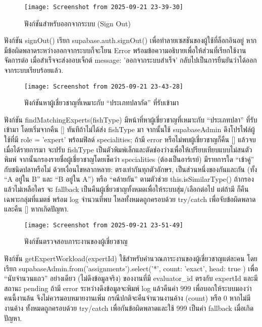 \newpage

\begin{figure}[h]
	\centering
	\texttt{[image: Screenshot from 2025-09-21 23-39-30]}
	\caption{ฟังก์ชันสำหรับออกจากระบบ (Sign Out)}
\end{figure}

\indent ฟังก์ชัน signOut() เรียก supabase.auth.signOut() เพื่อทำลายเซสชันของผู้ใช้ที่ล็อกอินอยู่ หากมีข้อผิดพลาดระหว่างออกจากระบบก็จะโยน Error พร้อมข้อความอธิบายเพื่อให้ส่วนที่เรียกใช้งานจัดการต่อ เมื่อสำเร็จจะส่งออบเจ็กต์ { message: 'ออกจากระบบสำเร็จ' } กลับไปเป็นการยืนยันว่าได้ออกจากระบบเรียบร้อยแล้ว.

\vspace{\baselineskip}

\begin{figure}[h]
	\centering
	\texttt{[image: Screenshot from 2025-09-21 23-43-28]}
	\caption{ฟังก์ชันหาผู้เชี่ยวชาญที่เหมาะกับ “ประเภทปลากัด” ที่รับเข้ามา}
\end{figure}

\indent ฟังก์ชัน findMatchingExperts(fishType) มีหน้าที่หาผู้เชี่ยวชาญที่เหมาะกับ “ประเภทปลา” ที่รับเข้ามา โดยเริ่มจากคืน [] ทันทีถ้าไม่ได้ส่ง fishType มา จากนั้นใช้ supabaseAdmin ดึงโปรไฟล์ผู้ใช้ที่มี role = 'expert' พร้อมฟิลด์ specialities; ถ้ามี error หรือไม่พบผู้เชี่ยวชาญก็คืน [] แล้วจบ เมื่อได้รายการมา จะปรับ fishType เป็นตัวพิมพ์เล็กและตัดช่องว่างเพื่อให้เปรียบเทียบแบบไม่สนตัวพิมพ์ จากนั้นกรองรายชื่อผู้เชี่ยวชาญโดยเช็คว่า specialities (ต้องเป็นอาร์เรย์) มีรายการใด “เข้าคู่” กับชนิดปลาหรือไม่ ด้วยเงื่อนไขหลากหลาย: ตรงเท่ากันทุกตัวอักษร, เป็นส่วนหนึ่งของกันและกัน (ทั้ง “A อยู่ใน B” และ “B อยู่ใน A”) หรือ “คล้ายกัน” ตามตัวช่วย this.isSimilarType() ถ้ากรองแล้วไม่เหลือใคร จะ fallback เป็นคืนผู้เชี่ยวชาญทั้งหมดเพื่อให้ระบบสุ่ม/เลือกต่อไป แต่ถ้ามี ก็คืนเฉพาะกลุ่มที่แมตช์ พร้อม log จำนวนที่พบ ไหลทั้งหมดถูกครอบด้วย try/catch เพื่อจับข้อผิดพลาดและคืน [] หากเกิดปัญหา.

\vspace{\baselineskip}

\begin{figure}[h]
	\centering
	\texttt{[image: Screenshot from 2025-09-21 23-51-49]}
	\caption{ฟังก์ชันตรวจสอบภาระงานของผู้เชี่ยวชาญ}
\end{figure}

\indent ฟังก์ชัน getExpertWorkload(expertId) ใช้สำหรับคำนวณภาระงานของผู้เชี่ยวชาญแต่ละคน โดยเรียก supabaseAdmin.from('assignments').select('*', { count: 'exact', head: true }) เพื่อ “นับจำนวนแถว” อย่างเดียว (ไม่ดึงข้อมูลจริง) ของงานที่มี evaluator\_id ตรงกับ expertId และมีสถานะ pending ถ้ามี error ระหว่างดึงข้อมูลจะพิมพ์ log แล้วคืนค่า 999 เพื่อบอกให้ระบบมองว่าคนนี้งานล้น จึงไม่ควรมอบหมายงานเพิ่ม กรณีปกติจะคืนจำนวนงานค้าง (count) หรือ 0 หากไม่มีงานค้าง ทั้งหมดถูกครอบด้วย try/catch เพื่อกันข้อผิดพลาดและใช้ 999 เป็นค่า fallback เมื่อเกิดปัญหา.


